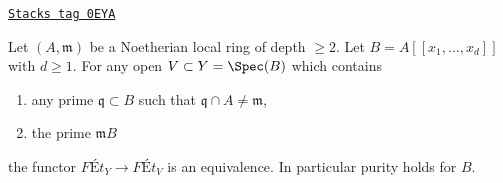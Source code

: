 \begin{lemma}
\label{pione-lemma-purity-power-series-over-depth2}
\href{https://stacks.math.columbia.edu/tag/0EYA}{\texttt{Stacks tag 0EYA}}


Let $(A, \mathfrak m)$ be a Noetherian local ring of depth $\geq 2$. Let
$B = A[[x_1, \ldots, x_d]]$ with $d \geq 1$. For any open
$V \subset Y = \Spec(B)$ which contains
\begin{enumerate}
\item any prime $\mathfrak q \subset B$ such that
$\mathfrak q \cap A \not = \mathfrak m$,
\item the prime $\mathfrak m B$
\end{enumerate}
the functor
$
\textit{F\'Et}_Y
\to
\textit{F\'Et}_V
$
is an equivalence. In particular purity holds for $B$.
\end{lemma}


